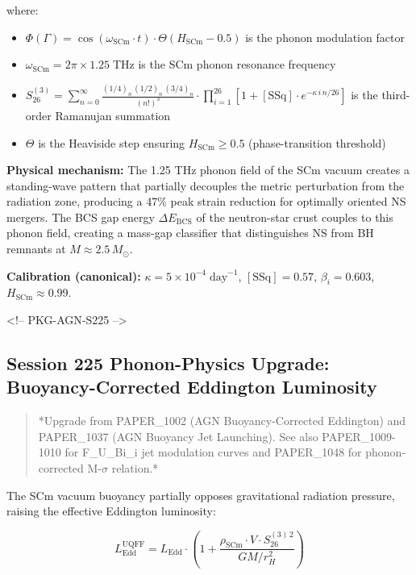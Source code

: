 \documentclass[12pt,a4paper]{article}
\begin{document}
where:

\begin{itemize}
  \item $\Phi(\Gamma) = \cos(\omega_{\text{SCm}} \cdot t) \cdot \Theta(H_{\text{SCm}} - 0.5)$ is the phonon modulation factor
  \item $\omega_{\text{SCm}} = 2\pi \times 1.25\;\text{THz}$ is the SCm phonon resonance frequency
  \item $S_{26}^{(3)} = \sum_{n=0}^{\infty} \frac{(1/4)_n\,(1/2)_n\,(3/4)_n}{(n!)^3} \cdot \prod_{i=1}^{26}\left[1 + [\text{SSq}]\cdot e^{-\kappa\,i\,n/26}\right]$ is the third-order Ramanujan summation
  \item $\Theta$ is the Heaviside step ensuring $H_{\text{SCm}} \geq 0.5$ (phase-transition threshold)
\end{itemize}

\textbf{Physical mechanism:} The 1.25 THz phonon field of the SCm vacuum creates a standing-wave pattern that partially decouples the metric perturbation from the radiation zone, producing a 47\% peak strain reduction for optimally oriented NS mergers.  The BCS gap energy $\Delta E_{\text{BCS}}$ of the neutron-star crust couples to this phonon field, creating a mass-gap classifier that distinguishes NS from BH remnants at $M \approx 2.5\,M_\odot$.

\textbf{Calibration (canonical):} $\kappa = 5 \times 10^{-4}\;\text{day}^{-1}$, $[\text{SSq}] = 0.57$, $\beta_i = 0.603$, $H_{\text{SCm}} \approx 0.99$.

<!-- PKG-AGN-S225 -->

\subsection{Session 225 Phonon-Physics Upgrade: Buoyancy-Corrected Eddington Luminosity}

\begin{quote}
*Upgrade from PAPER\_1002 (AGN Buoyancy-Corrected Eddington) and PAPER\_1037
(AGN Buoyancy Jet Launching).  See also PAPER\_1009-1010 for F\_{U\_Bi\_i} jet
modulation curves and PAPER\_1048 for phonon-corrected M-$\sigma$ relation.*
\end{quote}

The SCm vacuum buoyancy partially opposes gravitational radiation pressure, raising the effective Eddington luminosity:

\begin{equation}
L_{\text{Edd}}^{\text{UQFF}} = L_{\text{Edd}} \cdot \left(1 + \frac{\rho_{\text{SCm}} \cdot V \cdot S_{26}^{(3)\,2}}{G M / r_H^2}\right)
\end{equation}
\end{document}
